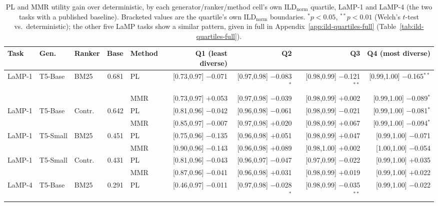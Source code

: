 \documentclass[10pt,twocolumn]{article}
\begin{document}
\begin{table}[t]
\centering
\scriptsize
\caption{PL and MMR utility gain over deterministic, by each generator/ranker/method
cell's own ILD$_{\text{norm}}$ quartile, LaMP-1 and LaMP-4 (the two tasks with a
published baseline). Bracketed values are the quartile's own ILD$_{\text{norm}}$
boundaries. $^*p{<}0.05$, $^{**}p{<}0.01$ (Welch's $t$-test vs.\ deterministic); the
other five LaMP tasks show a similar pattern, given in full in
Appendix~\ref{app:ild-quartiles-full} (Table~\ref{tab:ild-quartiles-full}).}
\label{tab:ild-quartiles}
\begin{tabular}{@{}lllrlrrrr@{}}
\toprule
Task & Gen. & Ranker & Base & Method & Q1 (least diverse) & Q2 & Q3 & Q4 (most diverse) \\
\midrule
\multirow{2}{*}{LaMP-1} & \multirow{2}{*}{T5-Base} & \multirow{2}{*}{BM25} & \multirow{2}{*}{0.681} & PL & [0.73,0.97] $-$0.071 & [0.97,0.98] $-$0.083$^{*}$ & [0.98,0.99] $-$0.121$^{**}$ & [0.99,1.00] $-$0.165$^{**}$ \\
 & & & & MMR & [0.73,0.97] $+$0.053 & [0.97,0.98] $-$0.039 & [0.98,0.99] $+$0.002 & [0.99,1.00] $-$0.089$^{*}$ \\
\cmidrule(lr){1-9}
\multirow{2}{*}{LaMP-1} & \multirow{2}{*}{T5-Base} & \multirow{2}{*}{Contr.} & \multirow{2}{*}{0.642} & PL & [0.81,0.96] $-$0.042 & [0.96,0.98] $-$0.061 & [0.98,0.99] $-$0.021 & [0.99,1.00] $-$0.081$^{*}$ \\
 & & & & MMR & [0.85,0.97] $-$0.007 & [0.97,0.98] $+$0.020 & [0.98,0.99] $+$0.067 & [0.99,1.00] $-$0.094$^{*}$ \\
\cmidrule(lr){1-9}
\multirow{2}{*}{LaMP-1} & \multirow{2}{*}{T5-Small} & \multirow{2}{*}{BM25} & \multirow{2}{*}{0.451} & PL & [0.75,0.96] $-$0.135 & [0.96,0.98] $+$0.051 & [0.98,0.99] $+$0.047 & [0.99,1.00] $-$0.071 \\
 & & & & MMR & [0.90,0.96] $-$0.143 & [0.96,0.98] $+$0.089 & [0.98,1.00] $+$0.002 & [1.00,1.00] $-$0.054 \\
\cmidrule(lr){1-9}
\multirow{2}{*}{LaMP-1} & \multirow{2}{*}{T5-Small} & \multirow{2}{*}{Contr.} & \multirow{2}{*}{0.431} & PL & [0.81,0.96] $-$0.043 & [0.96,0.97] $-$0.047 & [0.97,0.99] $-$0.022 & [0.99,1.00] $+$0.035 \\
 & & & & MMR & [0.87,0.96] $-$0.041 & [0.96,0.98] $+$0.031 & [0.98,0.99] $+$0.019 & [0.99,1.00] $+$0.022 \\
\midrule
\multirow{2}{*}{LaMP-4} & \multirow{2}{*}{T5-Base} & \multirow{2}{*}{BM25} & \multirow{2}{*}{0.291} & PL & [0.46,0.97] $-$0.011 & [0.97,0.98] $-$0.028$^{*}$ & [0.98,0.99] $-$0.035$^{**}$ & [0.99,1.00] $-$0.022 \\

\end{tabular}
\end{table}
\end{document}
